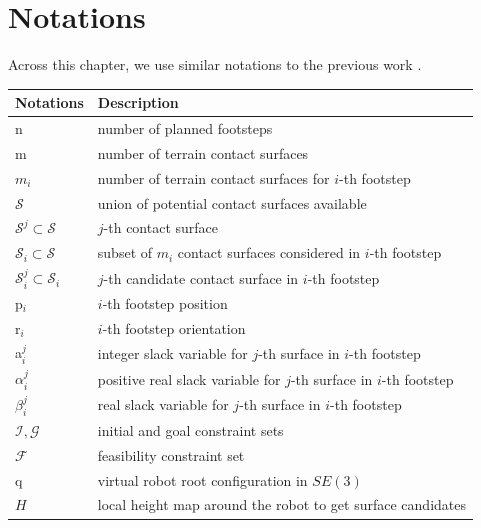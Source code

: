 \section{Notations}
\label{sub:mip:notations}
Across this chapter, we use similar notations to the previous work \cite{sl1m_v2}.
\begin{center}
\begin{tabular}{ l l } 
    \hline
    \textbf{Notations} & \textbf{Description} \\ 
    \hline
    n                  & number of planned footsteps \\ 
    m                  & number of terrain contact surfaces \\ 
    $m_i$                & number of terrain contact surfaces for $i$-th footstep \\
    $\mathcal{S}$      & union of potential contact surfaces available \\
    $\mathcal{S}^j \subset \mathcal{S}$     & $j$-th contact surface \\
    $\mathcal{S}_i \subset \mathcal{S}$     & subset of $m_i$ contact surfaces considered in $i$-th footstep \\ 
    $\mathcal{S}_i^j \subset \mathcal{S}_i$ & $j$-th candidate contact surface in $i$-th footstep \\ 
    p$_i$              & $i$-th footstep position\\ 
    r$_i$              & $i$-th footstep orientation\\
    a$_i^j$            & integer slack variable for $j$-th surface in $i$-th footstep \\ 
    $\alpha_i^j$       & positive real slack variable for $j$-th surface in $i$-th footstep \\ 
    $\beta_i^j$        & real slack variable for $j$-th surface in $i$-th footstep \\
    $\mathcal{I}, \mathcal{G}$      & initial and goal constraint sets \\
    $\mathcal{F}$      & feasibility constraint set \\
    q              & virtual robot root configuration in $SE(3)$\\
    $H$              & local height map around the robot to get surface candidates\\
    \hline
\end{tabular}
\end{center}

